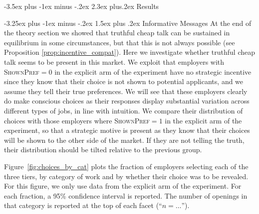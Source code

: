\documentclass[12pt]{article}
\makeatletter
\renewcommand{\section}{%
  \@startsection{section}{1}{\z@}%
  {-3.5ex plus -1ex minus -.2ex}%
  {2.3ex plus.2ex}%
  {\normalfont\Large\bfseries}%
}
\renewcommand{\subsection}{%
  \@startsection{subsection}{2}{\z@}%
  {-3.25ex plus -1ex minus -.2ex}%
  {1.5ex plus .2ex}%
  {\normalfont\large\bfseries}%
}
\makeatother
\begin{document}
\section{Results} \label{sec:results}

\subsection{Informative Messages} \label{sec:results_existence} %
At the end of the theory section we showed that truthful cheap talk can be sustained in equilibrium in some circumstances, but that this is not always possible (see Proposition \ref{prop:incentive_compat}). Here we investigate whether truthful cheap talk seems to be present in this market. We exploit that employers with \textsc{ShownPref}$=0$ in the explicit arm of the experiment have no strategic incentive since they know that their choice is not shown to potential applicants, and we assume they tell their true preferences. We will see that these employers clearly do make conscious choices as their responses display substantial variation across different types of jobs, in line with intuition. We compare their distribution of choices with those employers where \textsc{ShownPref}$=1$ in the explicit arm of the experiment, so that a strategic motive is present as they know that their choices will be shown to the other side of the market. If they are not telling the truth, their distribution should be tilted relative to the previous group. 

Figure~\ref{fig:choices_by_cat} plots the fraction of employers selecting each of the three tiers, by category of work and by whether their choice was to be revealed.
For this figure, we only use data from the explicit arm of the experiment. 
For each fraction, a 95\% confidence interval is reported. 
The number of openings in that category is reported at the top of each facet (``$n = \ldots$''). 
\end{document}
